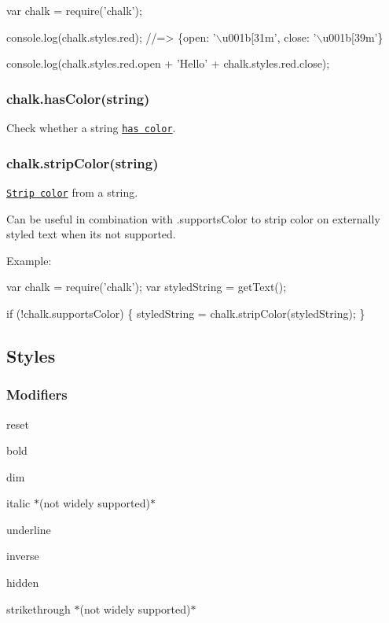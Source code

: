\begin{DoxyCode}
var chalk = require('chalk');

console.log(chalk.styles.red);
//=> \{open: '\(\backslash\)u001b[31m', close: '\(\backslash\)u001b[39m'\}

console.log(chalk.styles.red.open + 'Hello' + chalk.styles.red.close);
\end{DoxyCode}


\subsubsection*{chalk.\+has\+Color(string)}

Check whether a string \href{https://github.com/chalk/has-ansi}{\tt has color}.

\subsubsection*{chalk.\+strip\+Color(string)}

\href{https://github.com/chalk/strip-ansi}{\tt Strip color} from a string.

Can be useful in combination with {\ttfamily .supports\+Color} to strip color on externally styled text when it\textquotesingle{}s not supported.

Example\+:


\begin{DoxyCode}
var chalk = require('chalk');
var styledString = getText();

if (!chalk.supportsColor) \{
    styledString = chalk.stripColor(styledString);
\}
\end{DoxyCode}


\subsection*{Styles}

\subsubsection*{Modifiers}


\begin{DoxyItemize}
\item {\ttfamily reset}
\item {\ttfamily bold}
\item {\ttfamily dim}
\item {\ttfamily italic} $\ast$(not widely supported)$\ast$
\item {\ttfamily underline}
\item {\ttfamily inverse}
\item {\ttfamily hidden}
\item {\ttfamily strikethrough} $\ast$(not widely supported)$\ast$
\end{DoxyItemize}

